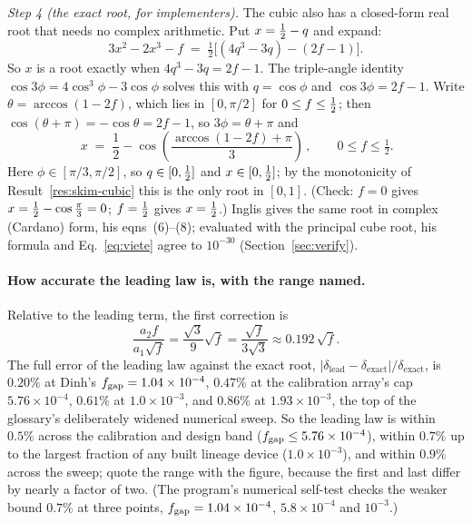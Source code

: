 \emph{Step 4 (the exact root, for implementers).} The cubic also has a closed-form real root
that needs no complex arithmetic. Put $x=\tfrac{1}{2}-q$ and expand:
\begin{equation}
3x^2-2x^3-f \;=\; \tfrac12\Big[(4q^3-3q)-(2f-1)\Big].
\end{equation}
So $x$ is a root exactly when $4q^3-3q=2f-1$. The triple-angle identity
$\cos3\phi=4\cos^3\phi-3\cos\phi$ solves this with $q=\cos\phi$ and $\cos3\phi=2f-1$.
Write $\theta=\arccos(1-2f)$, which lies in $[0,\pi/2]$ for $0\le f\le\tfrac{1}{2}$; then
$\cos(\theta+\pi)=-\cos\theta=2f-1$, so $3\phi=\theta+\pi$ and
\begin{equation}
\boxed{\,x \;=\; \frac12-\cos\!\left(\frac{\arccos(1-2f)+\pi}{3}\right)\,},\qquad 0\le f\le\tfrac12 .
\label{eq:viete}
\end{equation}
Here $\phi\in[\pi/3,\pi/2]$, so $q\in[0,\tfrac{1}{2}]$ and $x\in[0,\tfrac{1}{2}]$; by the monotonicity of
Result~\ref{res:skim-cubic} this is the only root in $[0,1]$. (Check: $f=0$ gives
$x=\tfrac{1}{2}-\cos\frac{\pi}{3}=0$; $f=\tfrac{1}{2}$ gives $x=\tfrac{1}{2}$.) Inglis gives the same root in
complex (Cardano) form, his eqns~(6)--(8); evaluated with the principal cube root, his formula
and Eq.~\eqref{eq:viete} agree to $10^{-30}$ (Section~\ref{sec:verify}).

\paragraph{How accurate the leading law is, with the range named.} Relative to the leading
term, the first correction is
\begin{equation}
\frac{a_2 f}{a_1\sqrt f} = \frac{\sqrt3}{9}\sqrt f = \frac{\sqrt f}{3\sqrt3} \approx 0.192\,\sqrt f .
\end{equation}
The full error of the leading law against the exact root, $|\delta_{\text{lead}}-\delta_{\text{exact}}|/\delta_{\text{exact}}$,
is $0.20\%$ at Dinh's $f_{\mathrm{gap}}=1.04\times10^{-4}$, $0.47\%$ at the calibration array's cap
$5.76\times10^{-4}$, $0.61\%$ at $1.0\times10^{-3}$, and $0.86\%$ at $1.93\times10^{-3}$, the top
of the glossary's deliberately widened numerical sweep. So the leading law is within $0.5\%$
across the calibration and design band ($f_{\mathrm{gap}}\le5.76\times10^{-4}$), within $0.7\%$ up to the
largest fraction of any built lineage device ($1.0\times10^{-3}$), and within $0.9\%$ across the
sweep; quote the range with the figure, because the first and last differ by nearly a factor of
two. (The program's numerical
self-test checks the weaker bound $0.7\%$ at three points, $f_{\mathrm{gap}}=1.04\times10^{-4}$,
$5.8\times10^{-4}$ and $10^{-3}$.)

